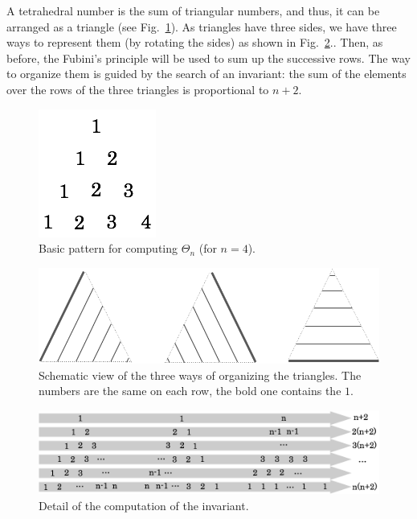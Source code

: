 A tetrahedral number is the sum of triangular numbers, and thus, it can be arranged as a triangle (see Fig.~\ref{fig:Tetrahedral3}).
As triangles have three sides, we have three ways to represent them (by rotating the sides) as shown in Fig.~\ref{fig:Tetrahedral1}..
Then, as before, the Fubini's principle will be used to sum up the successive rows.
The way to organize them is guided by the search of an invariant:
the sum of the elements over the rows of the three triangles is proportional to $n+2$.
\begin{figure}[h]
\begin{center}
        \includegraphics[scale=0.4]{FiguresArithmetic/appTetrahedral3}
        \caption{Basic pattern for computing $\Theta_n$ (for $n=4$).}
        \label{fig:Tetrahedral3}
\end{center}
\end{figure}
\begin{figure}[h]
\begin{center}
        \includegraphics[scale=0.3]{FiguresArithmetic/appTetrahedral1}
        \caption{Schematic view of the three ways of organizing the triangles.
        The numbers are the same on each row, the bold one contains the $1$.}
        \label{fig:Tetrahedral1}
\end{center}
\end{figure}
\begin{figure}[h]
\begin{center}
        \includegraphics[scale=0.32]{FiguresArithmetic/appTetrahedral4}
        \caption{Detail of the computation of the invariant.}
        \label{fig:Tetrahedral4}
\end{center}
\end{figure}
